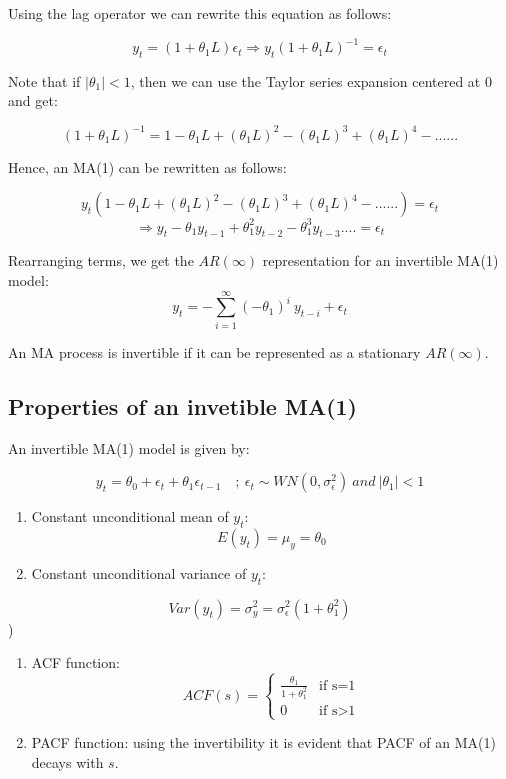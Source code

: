 \documentclass[]{book}
\theoremstyle{definition}
\theoremstyle{definition}
\theoremstyle{definition}
\theoremstyle{remark}
\let\BeginKnitrBlock\begin \let\EndKnitrBlock\end
\begin{document}
Using the lag operator we can rewrite this equation as follows:

\[y_t= (1+\theta_1L)\epsilon_t \Rightarrow y_t(1+\theta_1 L) ^{-1}=\epsilon_t\]

Note that if \(|\theta_1|<1\), then we can use the Taylor series
expansion centered at 0 and get:

\[(1+\theta_1 L)^{-1}=1-\theta_1 L+(\theta_1L)^2-(\theta_1L)^3+ (\theta_1L)^4-...... \]

Hence, an MA(1) can be rewritten as follows:

\[y_t (1-\theta_1 L+(\theta_1L)^2-(\theta_1L)^3+ (\theta_1L)^4-......)=\epsilon_t\]
\[\Rightarrow y_t -\theta_1 y_{t-1} +\theta_1^2y_{t-2}-\theta_1^3 y_{t-3}....=\epsilon_t\]

Rearranging terms, we get the \(AR(\infty)\) representation for an
invertible MA(1) model:
\[y_t=-\sum_{i=1}^{\infty}(-\theta_1)^i \ y_{t-i}+\epsilon_t\]

\BeginKnitrBlock{definition}
\protect\hypertarget{def:unnamed-chunk-8}{}{\label{def:unnamed-chunk-8} }An
MA process is invertible if it can be represented as a stationary
\(AR(\infty)\).
\EndKnitrBlock{definition}

\hypertarget{properties-of-an-invetible-ma1}{%
\subsection{Properties of an invetible
MA(1)}\label{properties-of-an-invetible-ma1}}

An invertible MA(1) model is given by:

\[ y_t = \theta_0 + \epsilon_t + \theta_1 \epsilon_{t-1} \quad ; \ \epsilon_t\sim WN(0, \sigma_\epsilon^2) \ and \  |\theta_1|<1\]

\begin{enumerate}
\def\labelenumi{\arabic{enumi}.}
\item
  Constant unconditional mean of \(y_t\): \[E(y_t)=\mu_y =\theta_0 \]
\item
  Constant unconditional variance of \(y_t\):
\end{enumerate}

\[Var(y_t)=\sigma^2_y=\sigma^2_\epsilon(1+\theta_1^2)\])

\begin{enumerate}
\def\labelenumi{\arabic{enumi}.}
\setcounter{enumi}{2}
\item
  ACF function: \begin{equation*}
    ACF(s) =
    \begin{cases}
   \frac{\theta_1}{1+\theta_1^2} & \text{if  s=1}\\
   0 & \text{if s>1}
    \end{cases}
   \end{equation*}
\item
  PACF function: using the invertibility it is evident that PACF of an
  MA(1) decays with \(s\).
\end{enumerate}
\end{document}
